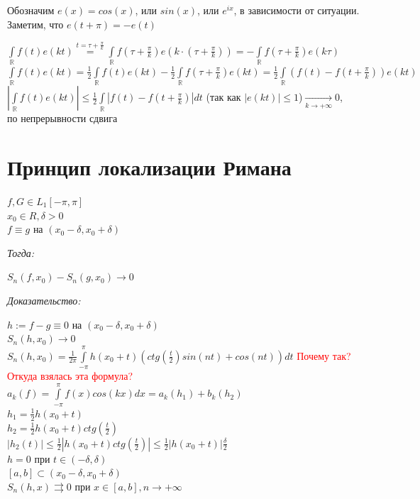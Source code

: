 \documentclass[paper=a4, fontsize=17pt]{article}
\begin{document}
Обозначим $e(x) = cos(x)$, или $sin(x)$, или $e^{ix}$, в зависимости от ситуации. Заметим, что $e(t + \pi) = -e(t)$

$\int\limits_{\mathds{R}}f(t)e(kt)  {\overset{t=\tau + \frac{\pi}{k}}{=}} \int\limits_{\mathds{R}}f(\tau + \frac{\pi}{k})e(k \cdot (\tau + \frac{\pi}{k})) = -\int\limits_{\mathds{R}}f(\tau + \frac{\pi}{k})e(k \tau)$ \\
$\int\limits_{\mathds{R}}f(t)e(kt) = \frac{1}{2}\int\limits_{\mathds{R}}f(t)e(kt) - \frac{1}{2}\int\limits_{\mathds{R}}f(\tau + \frac{\pi}{k})e(kt) = \frac{1}{2}\int\limits_{\mathds{R}}(f(t) - f(t + \frac{\pi}{k})) e(kt)$ \\

$|\int\limits_{\mathds{R}}f(t)e(kt)| \leq\frac{1}{2}\int\limits_{\mathds{R}}|f(t) - f(t + \frac{\pi}{k})|dt$ (так как $|e(kt)| \leq 1$)$ \xrightarrow[k \to +\infty]{}0$,\\по непрерывности сдвига

\section{Принцип локализации Римана}

$ f, G \in L_1[-\pi, \pi] $\\
$ x_0 \in R, \delta > 0 $\\
$ f \equiv g $ на $ (x_0 - \delta, x_0 + \delta) $

\emph{Тогда:}

$ S_n(f, x_0) - S_n(g, x_0) \to 0 $

\emph{Доказательство:}

$ h := f - g \equiv 0 $ на $ (x_0 - \delta, x_0 + \delta) $\\
$ S_n(h, x_0) \to 0 $\\
$ S_n(h, x_0) = \frac{1}{2\pi} \int\limits_{-\pi}^{\pi} h(x_0 + t) (ctg(\frac{t}{2}) sin(nt) + cos(nt)) dt $ \textcolor{red}{Почему так? Откуда взялась эта формула?}\\
$ a_k(f) = \int\limits_{-\pi}^{\pi} f(x) cos(kx) dx = a_k(h_1) + b_k(h_2) $\\
$ h_1 = \frac{1}{2} h(x_0 + t) $\\
$ h_2 = \frac{1}{2} h(x_0 + t) ctg(\frac{t}{2}) $\\
$ |h_2(t)| \leq \frac{1}{2} |h(x_0 + t) ctg(\frac{t}{2})| \leq \frac{1}{2} |h(x_0 + t)| \frac{\delta}{2} $\\
$ h = 0 $ при $ t \in (-\delta, \delta) $\\
$ [a, b] \subset (x_0 - \delta, x_0 + \delta) $\\
$ S_n(h, x) \rightrightarrows 0 $ при $ {x \in [a, b], n \to +\infty} $
\end{document}
